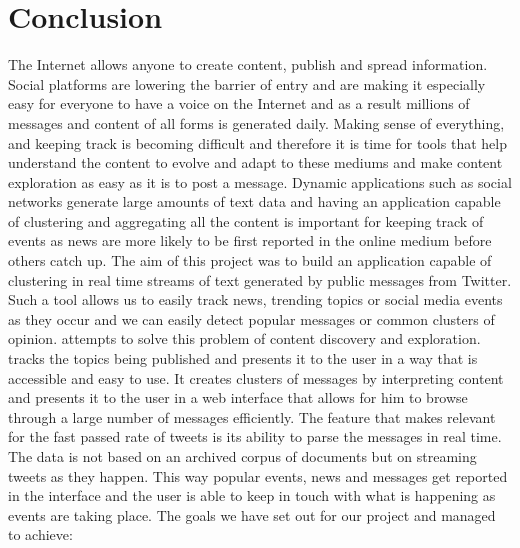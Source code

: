 \chapter{Conclusion}
\label{chapter:conclusion}

The Internet allows anyone to create content, publish and spread information. Social platforms are lowering the barrier of entry and are making it especially easy for everyone to have a voice on the Internet and as a result millions of messages and content of all forms is generated daily. Making sense of everything, and keeping track is becoming difficult and therefore it is time for tools that help understand the content to evolve and adapt to these mediums and make content exploration as easy as it is to post a message.
\newline
Dynamic applications such as social networks generate large amounts of text data and having an application capable of clustering and aggregating all the content is important for keeping track of events as news are more likely to be first reported in the online medium before others catch up.
\newline
The aim of this project was to build an application capable of clustering in real time streams of text generated by public messages from Twitter. Such a tool allows us to easily track news, trending topics or social media events as they occur and we can easily detect popular messages or common clusters of opinion.
\newline
{\project}  attempts to solve this problem of content discovery and exploration. {\project}  tracks the topics being published and presents it to the user in a way that is accessible and easy to use. It creates clusters of messages by interpreting content and presents it to the user in a web interface that allows for him to browse through a large number of messages efficiently.
\newline
The feature that makes {\project}  relevant for the fast passed rate of tweets is its ability to parse the messages in real time. The data is not based on an archived corpus of documents but on streaming tweets as they happen. This way popular events, news and messages get reported in the interface and the user is able to keep in touch with what is happening as events are taking place.
\newline
The goals we have set out for our project and managed to achieve:
